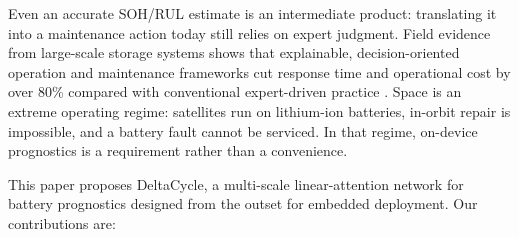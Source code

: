 \documentclass[final,5p,times,twocolumn]{elsarticle}
\begin{document}
Even an
accurate SOH/RUL estimate is an intermediate product: translating
it into a maintenance action today still relies on expert judgment.
Field evidence from large-scale storage systems shows that
explainable, decision-oriented operation and maintenance frameworks
cut response time and operational cost by over 80\% compared with
conventional expert-driven practice \cite{ref_qu_bess}. Space is an extreme operating regime: satellites run on
lithium-ion batteries, in-orbit repair is impossible, and a battery fault
cannot be serviced. In that regime, on-device prognostics is a requirement
rather than a convenience.

This paper proposes DeltaCycle, a multi-scale linear-attention
network for battery prognostics designed from the outset for embedded
deployment. Our contributions are:
\end{document}

